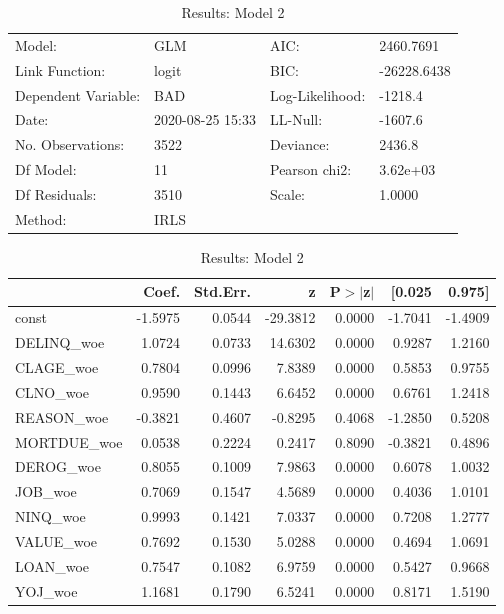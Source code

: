 \begin{appendices}
\begin{table}
\renewcommand{\arraystretch}{1.25}
\begin{center}
\begin{tabular}{llll}
\hline
Model:              & GLM              & AIC:            & 2460.7691    \\
Link Function:      & logit            & BIC:            & -26228.6438  \\
Dependent Variable: & BAD              & Log-Likelihood: & -1218.4      \\
Date:               & 2020-08-25 15:33 & LL-Null:        & -1607.6      \\
No. Observations:   & 3522             & Deviance:       & 2436.8       \\
Df Model:           & 11               & Pearson chi2:   & 3.62e+03     \\
Df Residuals:       & 3510             & Scale:          & 1.0000       \\
Method:             & IRLS             &                 &              \\
\hline
\end{tabular}
\end{center}
\begin{center}
\begin{tabular}{lrrrrrr}
\hline
             &  Coef.  & Std.Err. &    z     & P$> |$z$|$ &  [0.025 &  0.975]  \\
\hline
\hline
const        & -1.5975 &   0.0544 & -29.3812 &      0.0000 & -1.7041 & -1.4909  \\
DELINQ\_woe  &  1.0724 &   0.0733 &  14.6302 &      0.0000 &  0.9287 &  1.2160  \\
CLAGE\_woe   &  0.7804 &   0.0996 &   7.8389 &      0.0000 &  0.5853 &  0.9755  \\
CLNO\_woe    &  0.9590 &   0.1443 &   6.6452 &      0.0000 &  0.6761 &  1.2418  \\
REASON\_woe  & -0.3821 &   0.4607 &  -0.8295 &      0.4068 & -1.2850 &  0.5208  \\
MORTDUE\_woe &  0.0538 &   0.2224 &   0.2417 &      0.8090 & -0.3821 &  0.4896  \\
DEROG\_woe   &  0.8055 &   0.1009 &   7.9863 &      0.0000 &  0.6078 &  1.0032  \\
JOB\_woe     &  0.7069 &   0.1547 &   4.5689 &      0.0000 &  0.4036 &  1.0101  \\
NINQ\_woe    &  0.9993 &   0.1421 &   7.0337 &      0.0000 &  0.7208 &  1.2777  \\
VALUE\_woe   &  0.7692 &   0.1530 &   5.0288 &      0.0000 &  0.4694 &  1.0691  \\
LOAN\_woe    &  0.7547 &   0.1082 &   6.9759 &      0.0000 &  0.5427 &  0.9668  \\
YOJ\_woe     &  1.1681 &   0.1790 &   6.5241 &      0.0000 &  0.8171 &  1.5190  \\
\hline
\end{tabular}
\end{center}
\caption{Results: Model 2}
\end{table}


\end{appendices}

